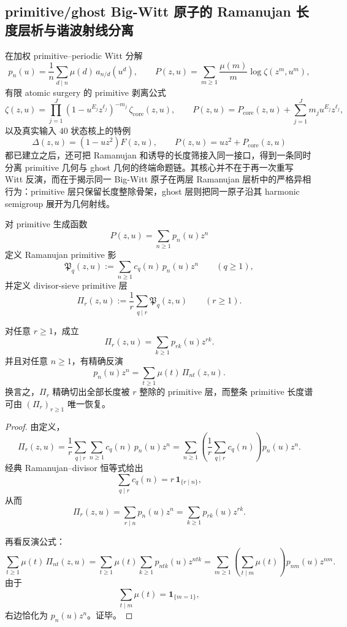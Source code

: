 \subsection{primitive/ghost Big-Witt 原子的 Ramanujan 长度层析与谐波射线分离}\label{subsec:conclusion-primitive-ramanujan-divisor-ghost-tomography}
在加权 primitive--periodic Witt 分解
\[
p_n(u)=\frac1n\sum_{d\mid n}\mu(d)\,a_{n/d}(u^d),
\qquad
P(z,u)=\sum_{m\ge 1}\frac{\mu(m)}{m}\log\zeta(z^m,u^m),
\]
有限 atomic surgery 的 primitive 剥离公式
\[
\zeta(z,u)=\prod_{j=1}^{J}(1-u^{E_j}z^{\ell_j})^{-m_j}\,\zeta_{\mathrm{core}}(z,u),
\qquad
P(z,u)=P_{\mathrm{core}}(z,u)+\sum_{j=1}^{J}m_j u^{E_j}z^{\ell_j},
\]
以及真实输入 \(40\) 状态核上的特例
\[
\Delta(z,u)=(1-uz^2)F(z,u),
\qquad
P(z,u)=uz^2+P_{\mathrm{core}}(z,u)
\]
都已建立之后，还可把 Ramanujan 和诱导的长度筛接入同一接口，得到一条同时分离 primitive 几何与 ghost 几何的终端命题链。其核心并不在于再一次重写 Witt 反演，而在于揭示同一 Big-Witt 原子在两层 Ramanujan 层析中的严格异相行为：primitive 层只保留长度整除骨架，ghost 层则把同一原子沿其 harmonic semigroup 展开为几何射线。

对 primitive 生成函数
\[
P(z,u)=\sum_{n\ge 1}p_n(u)z^n
\]
定义 Ramanujan primitive 影
\[
\mathfrak P_q(z,u):=\sum_{n\ge 1}c_q(n)\,p_n(u)z^n
\qquad (q\ge 1),
\]
并定义 divisor-sieve primitive 层
\[
\Pi_r(z,u):=\frac1r\sum_{q\mid r}\mathfrak P_q(z,u)
\qquad (r\ge 1).
\]

\begin{theorem}\label{thm:conclusion-primitive-ramanujan-divisor-exact-tomography}
对任意 \(r\ge 1\)，成立
\[
\Pi_r(z,u)=\sum_{k\ge 1}p_{rk}(u)z^{rk}.
\]
并且对任意 \(n\ge 1\)，有精确反演
\[
p_n(u)z^n=\sum_{t\ge 1}\mu(t)\,\Pi_{nt}(z,u).
\]
换言之，\(\Pi_r\) 精确切出全部长度被 \(r\) 整除的 primitive 层，而整条 primitive 长度谱可由 \((\Pi_r)_{r\ge 1}\) 唯一恢复。
\end{theorem}
\begin{proof}
由定义，
\[
\Pi_r(z,u)
=
\frac1r\sum_{q\mid r}\sum_{n\ge 1}c_q(n)\,p_n(u)z^n
=
\sum_{n\ge 1}\left(\frac1r\sum_{q\mid r}c_q(n)\right)p_n(u)z^n.
\]
经典 Ramanujan--divisor 恒等式给出
\[
\sum_{q\mid r}c_q(n)=r\,\mathbf 1_{\{r\mid n\}},
\]
从而
\[
\Pi_r(z,u)=\sum_{r\mid n}p_n(u)z^n=\sum_{k\ge 1}p_{rk}(u)z^{rk}.
\]

再看反演公式：
\[
\sum_{t\ge 1}\mu(t)\,\Pi_{nt}(z,u)
=
\sum_{t\ge 1}\mu(t)\sum_{k\ge 1}p_{ntk}(u)z^{ntk}
=
\sum_{m\ge 1}\left(\sum_{t\mid m}\mu(t)\right)p_{nm}(u)z^{nm}.
\]
由于
\[
\sum_{t\mid m}\mu(t)=\mathbf 1_{\{m=1\}},
\]
右边恰化为 \(p_n(u)z^n\)。证毕。
\end{proof}

